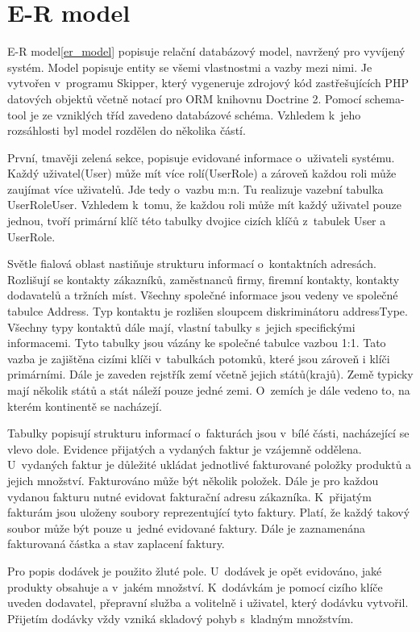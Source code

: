 \documentclass[thesis=B,czech]{FITthesis}[2012/06/26]
\begin{document}
\section{E-R model}
	E-R model\ref{er_model} popisuje relační databázový model, navržený pro vyvíjený systém. Model popisuje entity se všemi vlastnostmi a vazby mezi nimi. Je vytvořen v~programu Skipper, který vygeneruje zdrojový kód zastřešujících PHP datových objektů včetně notací pro ORM knihovnu Doctrine 2. Pomocí schema-tool je ze vzniklých tříd zavedeno databázové schéma. Vzhledem k~jeho rozsáhlosti byl model rozdělen do několika částí.
	
	První, tmavěji zelená sekce, popisuje evidované informace o~uživateli systému. Každý uživatel(User) může mít více rolí(UserRole) a zároveň každou roli může zaujímat více uživatelů. Jde tedy o~vazbu m:n. Tu realizuje vazební tabulka UserRoleUser. Vzhledem k~tomu, že každou roli může mít každý uživatel pouze jednou, tvoří primární klíč této tabulky dvojice cizích klíčů z~tabulek User a UserRole.
	
	Světle fialová oblast nastiňuje strukturu informací o~kontaktních adresách. Rozlišují se kontakty zákazníků, zaměstnanců firmy, firemní kontakty, kontakty dodavatelů a tržních míst. Všechny společné informace jsou vedeny ve společné tabulce Address. Typ kontaktu je rozlišen sloupcem diskriminátoru addressType. Všechny typy kontaktů dále mají, vlastní tabulky s~jejich specifickými informacemi. Tyto tabulky jsou vázány ke společné tabulce vazbou 1:1. Tato vazba je zajištěna cizími klíči v~tabulkách potomků, které jsou zároveň i klíči primárními. Dále je zaveden rejstřík zemí včetně jejich států(krajů). Země typicky mají několik států a stát náleží pouze jedné zemi. O~zemích je dále vedeno to, na kterém kontinentě se nacházejí.
	
	Tabulky popisují strukturu informací o~fakturách jsou v~bílé části, nacházející se vlevo dole. Evidence přijatých a vydaných faktur je vzájemně oddělena. U~vydaných faktur je důležité ukládat jednotlivé fakturované položky produktů a jejich množství. Fakturováno může být několik položek. Dále je pro každou vydanou fakturu nutné evidovat fakturační adresu zákazníka. K~přijatým fakturám jsou uloženy soubory reprezentující tyto faktury. Platí, že každý takový soubor může být pouze u~jedné evidované faktury. Dále je zaznamenána fakturovaná částka a stav zaplacení faktury. 
	
	Pro popis dodávek je použito žluté pole. U~dodávek je opět evidováno, jaké produkty obsahuje a v~jakém množství. K~dodávkám je pomocí cizího klíče uveden dodavatel, přepravní služba a volitelně i uživatel, který dodávku vytvořil. Přijetím dodávky vždy vzniká skladový pohyb s~kladným množstvím.
	
\end{document}
